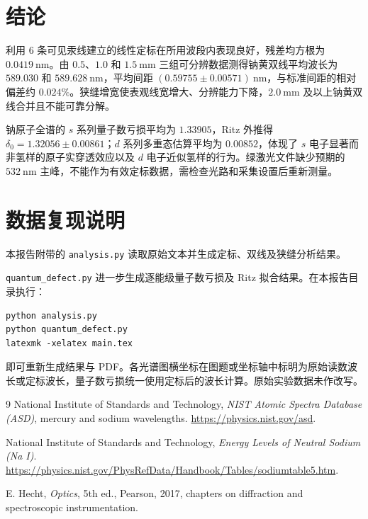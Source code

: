 \documentclass[UTF8,a4paper,11pt]{ctexart}
\begin{document}
\section{结论}
利用 6 条可见汞线建立的线性定标在所用波段内表现良好，残差均方根为 $0.0419\ \mathrm{nm}$。由 $0.5$、$1.0$ 和 $1.5\ \mathrm{mm}$ 三组可分辨数据测得钠黄双线平均波长为 $589.030$ 和 $589.628\ \mathrm{nm}$，平均间距 $(0.59755\pm0.00571)\ \mathrm{nm}$，与标准间距的相对偏差约 $0.024\%$。狭缝增宽使表观线宽增大、分辨能力下降，$2.0\ \mathrm{mm}$ 及以上钠黄双线合并且不能可靠分解。

钠原子全谱的 $s$ 系列量子数亏损平均为 $1.33905$，Ritz 外推得 $\delta_0=1.32056\pm0.00861$；$d$ 系列多重态估算平均为 $0.00852$，体现了 $s$ 电子显著而非氢样的原子实穿透效应以及 $d$ 电子近似氢样的行为。绿激光文件缺少预期的 $532\ \mathrm{nm}$ 主峰，不能作为有效定标数据，需检查光路和采集设置后重新测量。

\appendix
\section{数据复现说明}
本报告附带的 \texttt{analysis.py} 读取原始文本并生成定标、双线及狭缝分析结果。

\texttt{quantum\_defect.py} 进一步生成逐能级量子数亏损及 Ritz 拟合结果。在本报告目录执行：
\begin{verbatim}
python analysis.py
python quantum_defect.py
latexmk -xelatex main.tex
\end{verbatim}
即可重新生成结果与 PDF。各光谱图横坐标在图题或坐标轴中标明为原始读数波长或定标波长，量子数亏损统一使用定标后的波长计算。原始实验数据未作改写。

\begin{thebibliography}{9}
National Institute of Standards and Technology,
\emph{NIST Atomic Spectra Database (ASD)}, mercury and sodium wavelengths.
\url{https://physics.nist.gov/asd}.

National Institute of Standards and Technology,
\emph{Energy Levels of Neutral Sodium (Na I)}.
\url{https://physics.nist.gov/PhysRefData/Handbook/Tables/sodiumtable5.htm}.

E. Hecht,
\emph{Optics}, 5th ed., Pearson, 2017, chapters on diffraction and spectroscopic instrumentation.
\end{thebibliography}
\end{document}
